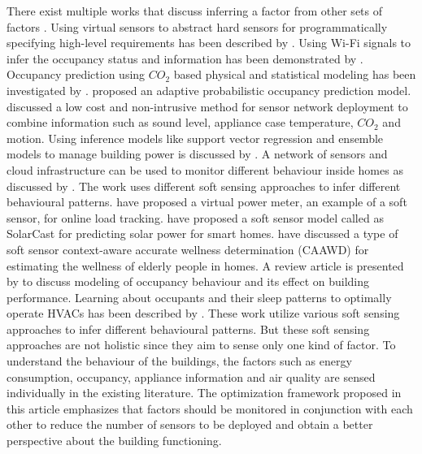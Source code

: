 \documentclass{article}
\begin{document}
There exist multiple works that discuss inferring a factor from other sets of factors \citep{anshuleEnergy16, balaji}.   
Using virtual sensors to abstract hard sensors for programmatically specifying high-level requirements has been described by \cite{virtual_senors}.   
Using Wi-Fi signals to infer the occupancy status and information has been demonstrated by \cite{occupancy_wifi, softgreen}.
Occupancy prediction using $CO_2$ based physical and statistical modeling has been investigated by \cite{elsevier_co2}. 
\cite{elsevier_occ_realtime}  proposed an adaptive probabilistic occupancy prediction model.
\cite{brown_fan}  discussed a low cost and non-intrusive method for sensor network deployment to combine information such as sound level, appliance case temperature, $CO_2$ and motion.
Using inference models like support vector regression and ensemble models to manage building power is discussed by \cite{tcps_bellala}.  
A network of sensors and cloud infrastructure can be used to monitor different behaviour inside homes as discussed by \cite{sensors_cloud_behaviour}. 
The work uses different soft sensing approaches to infer different behavioural patterns.
\cite{tcps_virtualpowermeter} have proposed a virtual power meter, an example of a soft sensor, for online load tracking.  
\cite{tcps_solarcast} have proposed a soft sensor model called as SolarCast for predicting solar power for smart homes.  
\cite{sensors_caawd} have discussed a type of soft sensor {context-aware accurate	wellness determination (CAAWD)} for estimating the wellness of elderly people in homes. 
A review article  is presented by \cite{scs_ob} to discuss modeling of occupancy behaviour and its effect on building performance.
Learning about occupants and their sleep patterns to optimally operate HVACs has been described by \cite{lu}. 
These work utilize various soft sensing approaches to infer different behavioural patterns.
But these soft sensing approaches are not holistic since they aim to sense only one kind of factor.  
To understand the behaviour of the buildings, the factors such as energy  consumption, occupancy, appliance information and air quality are sensed individually in the existing literature.
The optimization framework proposed in this article emphasizes that factors should be monitored in conjunction with each other to reduce the number of sensors to be deployed and obtain a better perspective about the building functioning.
\end{document}
